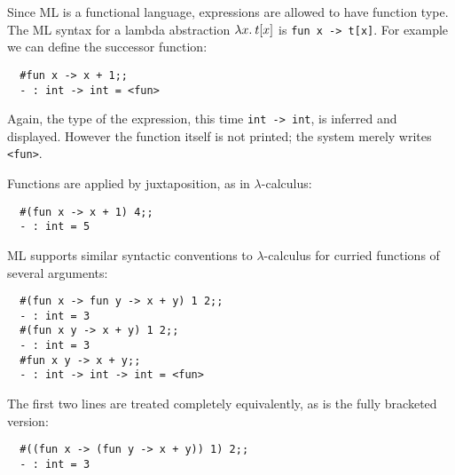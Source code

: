 \begin{slide*}


\vspace*{0.5cm}

Since ML is a functional language, expressions are allowed to have function
type. The ML syntax for a lambda abstraction {\red $\lambda x.\: t[x]$} is {\black
\tt fun x -> t[x]}. For example we can define the successor function:

\begin{black}
\begin{verbatim}
  #fun x -> x + 1;;
  - : int -> int = <fun>
\end{verbatim}
\end{black}

Again, the type of the expression, this time {\black \tt int -> int}, is
inferred and displayed. However the function itself is not printed; the system
merely writes {\black \tt <fun>}. 

Functions are applied by juxtaposition, as in $\lambda$-calculus:

\begin{black}
\begin{verbatim}
  #(fun x -> x + 1) 4;;
  - : int = 5
\end{verbatim}
\end{black}

\end{slide*}



\begin{slide*}


\vspace*{0.5cm}

ML supports similar syntactic conventions to $\lambda$-calculus for curried
functions of several arguments:

\begin{black}
\begin{verbatim}
  #(fun x -> fun y -> x + y) 1 2;;
  - : int = 3
  #(fun x y -> x + y) 1 2;;
  - : int = 3
  #fun x y -> x + y;;
  - : int -> int -> int = <fun>
\end{verbatim}
\end{black}

The first two lines are treated completely equivalently, as is the fully
bracketed version:

\begin{black}
\begin{verbatim}
  #((fun x -> (fun y -> x + y)) 1) 2;;
  - : int = 3
\end{verbatim}
\end{black}

\end{slide*}



